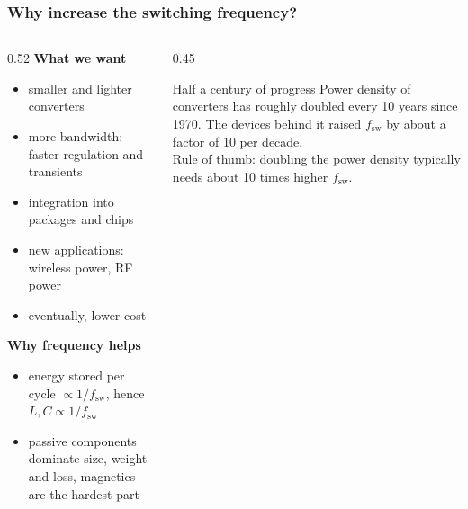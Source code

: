 \begin{frame}
	\frametitle{Why increase the switching frequency?}
	\begin{columns}[T]
		\begin{column}{0.52\textwidth}
			\small
			\textbf{What we want}
			\begin{itemize}
				\item smaller and lighter converters
				\item more bandwidth: faster regulation and transients
				\item integration into packages and chips
				\item new applications: wireless power, RF power
				\item eventually, lower cost
			\end{itemize}
			\textbf{Why frequency helps}
			\begin{itemize}
				\item energy stored per cycle $\propto 1/f_\mathrm{sw}$, hence $L, C \propto 1/f_\mathrm{sw}$
				\item passive components dominate size, weight and loss, magnetics are the hardest part
			\end{itemize}
		\end{column}
		\begin{column}{0.45\textwidth}
			\begin{block}{Half a century of progress}
				Power density of converters has roughly doubled every 10 years since 1970. The devices behind it raised $f_\mathrm{sw}$ by about a factor of 10 per decade.\\[0.4em]
				Rule of thumb: doubling the power density typically needs about 10 times higher $f_\mathrm{sw}$.
			\end{block}
		\end{column}
	\end{columns}
\end{frame}

